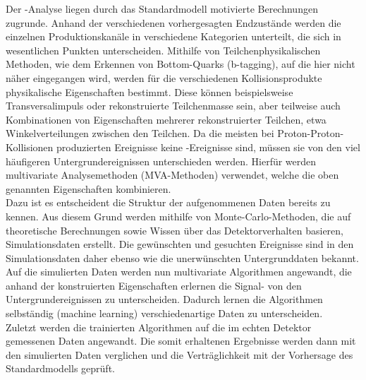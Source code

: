Der \ttH-Analyse liegen durch das Standardmodell motivierte Berechnungen zugrunde. Anhand der verschiedenen vorhergesagten Endzust\"ande werden die einzelnen Produktionskan\"ale in verschiedene Kategorien unterteilt, die sich in wesentlichen Punkten unterscheiden. Mithilfe von Teilchenphysikalischen Methoden, wie dem Erkennen von Bottom-Quarks (b-tagging), auf die hier nicht n\"aher eingegangen wird, werden f\"ur die verschiedenen Kollisionsprodukte physikalische Eigenschaften bestimmt. Diese k\"onnen beispielsweise Transversalimpuls oder rekonstruierte Teilchenmasse sein, aber teilweise auch Kombinationen von Eigenschaften mehrerer rekonstruierter Teilchen, etwa Winkelverteilungen zwischen den Teilchen. Da die meisten bei Proton-Proton-Kollisionen produzierten Ereignisse keine \ttH-Ereignisse sind, m\"ussen sie von den viel h\"aufigeren Untergrundereignissen unterschieden werden. Hierf\"ur werden multivariate Analysemethoden (MVA-Methoden) verwendet, welche die oben genannten Eigenschaften kombinieren.\\
Dazu ist es entscheident die Struktur der aufgenommenen Daten bereits zu kennen. Aus diesem Grund werden mithilfe von Monte-Carlo-Methoden, die auf theoretische Berechnungen sowie Wissen \"uber das Detektorverhalten basieren, Simulationsdaten erstellt. Die gew\"unschten und gesuchten Ereignisse sind in den Simulationsdaten daher ebenso wie die unerw\"unschten Untergrunddaten bekannt. Auf die simulierten Daten werden nun multivariate Algorithmen angewandt, die anhand der konstruierten Eigenschaften erlernen die Signal- von den Untergrundereignissen zu unterscheiden. Dadurch lernen die Algorithmen selbst\"andig (machine learning) verschiedenartige Daten zu unterscheiden.\\ %
Zuletzt werden die trainierten Algorithmen auf die im echten Detektor gemessenen Daten angewandt. Die somit erhaltenen Ergebnisse werden dann mit den simulierten Daten verglichen und die Vertr\"aglichkeit mit der Vorhersage des Standardmodells gepr\"uft.
